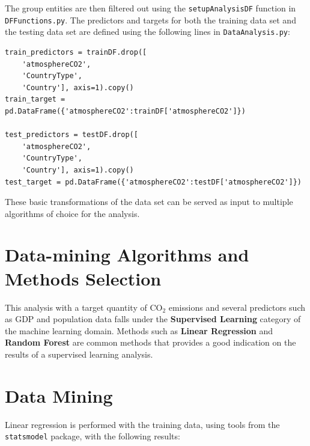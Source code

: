 \documentclass[11pt,a4paper,titlepage]{article}
\newcommand{\blankline}{\quad\pagebreak[2]}
\begin{document}
The group entities are then filtered out using the \texttt{setupAnalysisDF} function in \texttt{DFFunctions.py}. The predictors and targets for both the training data set and the testing data set are defined using the following lines in \texttt{DataAnalysis.py}:

\begin{verbatim}
train_predictors = trainDF.drop([
    'atmosphereCO2',
    'CountryType',
    'Country'], axis=1).copy()
train_target = pd.DataFrame({'atmosphereCO2':trainDF['atmosphereCO2']})

test_predictors = testDF.drop([
    'atmosphereCO2',
    'CountryType',
    'Country'], axis=1).copy()
test_target = pd.DataFrame({'atmosphereCO2':testDF['atmosphereCO2']})
\end{verbatim}

\blankline

These basic transformations of the data set can be served as input to multiple algorithms of choice for the analysis.

\section{Data-mining Algorithms and Methods Selection}

This analysis with a target quantity of CO$_{2}$ emissions and several predictors such as GDP and population data falls under the \textbf{Supervised Learning} category of the machine learning domain. Methods such as \textbf{Linear Regression} and \textbf{Random Forest} are common methods that provides a good indication on the results of a supervised learning analysis.

\section{Data Mining}

Linear regression is performed with the training data, using tools from the \texttt{statsmodel} package, with the following results:
\end{document}
